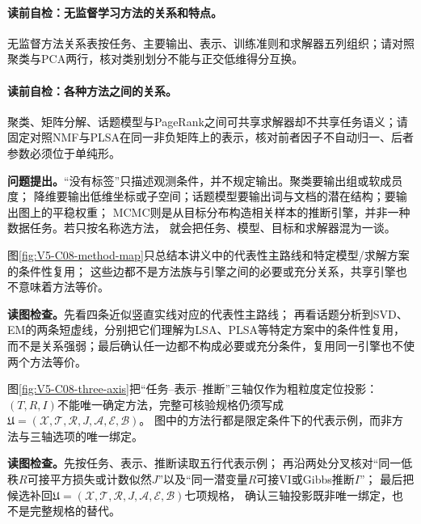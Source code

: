 \paragraph{读前自检：无监督学习方法的关系和特点。}无监督方法关系表按任务、主要输出、表示、训练准则和求解器五列组织；请对照聚类与PCA两行，核对类别划分不能与正交低维得分互换。\par
\paragraph{读前自检：各种方法之间的关系。}聚类、矩阵分解、话题模型与PageRank之间可共享求解器却不共享任务语义；请固定对照NMF与PLSA在同一非负矩阵上的表示，核对前者因子不自动归一、后者参数必须位于单纯形。\par


\label{struct:V5-C08-CH06}
\textbf{问题提出。}“没有标签”只描述观测条件，并不规定输出。聚类要输出组或软成员度；
降维要输出低维坐标或子空间；话题模型要输出词与文档的潜在结构；\PageRank{}要输出图上的平稳权重；
MCMC则是从目标分布构造相关样本的推断引擎，并非一种数据任务。若只按名称选方法，
就会把任务、模型、目标和求解器混为一谈。

图\ref{fig:V5-C08-method-map}只总结本讲义中的代表性主路线和特定模型/求解方案的条件性复用；
这些边都不是方法族与引擎之间的必要或充分关系，共享引擎也不意味着方法等价。

\FloatBarrier
\noindent\textbf{读图检查。}先看四条近似竖直实线对应的代表性主路线；
再看话题分析到SVD、EM的两条短虚线，分别把它们理解为LSA、PLSA等特定方案中的条件性复用，
而不是关系强弱；最后确认任一边都不构成必要或充分条件，复用同一引擎也不使两个方法等价。

图\ref{fig:V5-C08-three-axis}把“任务--表示--推断”三轴仅作为粗粒度定位投影：
$(T,R,I)$不能唯一确定方法，完整可核验规格仍须写成
$\mathfrak U=(\mathcal X,\mathcal T,\mathcal R,J,\mathcal A,\mathcal E,\mathcal B)$。
图中的方法行都是限定条件下的代表示例，而非方法与三轴选项的唯一绑定。

\FloatBarrier
\noindent\textbf{读图检查。}先按任务、表示、推断读取五行代表示例；
再沿两处分叉核对“同一低秩$R$可接平方损失或计数似然$J$”以及“同一潜变量$R$可接VI或Gibbs推断$I$”；
最后把候选补回$\mathfrak U=(\mathcal X,\mathcal T,\mathcal R,J,\mathcal A,\mathcal E,\mathcal B)$七项规格，
确认三轴投影既非唯一绑定，也不是完整规格的替代。

